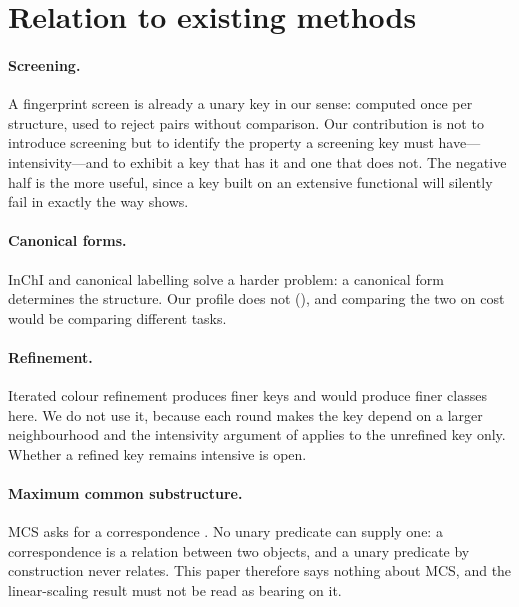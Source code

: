\documentclass[11pt,twocolumn,a4paper]{article}
\theoremstyle{upthm}
\theoremstyle{definition}
\theoremstyle{remark}
\begin{document}
\section{Relation to existing methods}
\label{sec:related}

\paragraph{Screening.} A fingerprint screen \citep{barnard1993,%
willett1998,sayle2012,swamidass2007} is already a unary key in our sense:
computed once per structure, used to reject pairs without comparison. Our
contribution is not to introduce screening but to identify the property a
screening key must have---intensivity---and to exhibit a key that has it
and one that does not. The negative half is the more useful, since a key
built on an extensive functional will silently fail in exactly the way
 shows.

\paragraph{Canonical forms.} InChI \citep{heller2015} and canonical
labelling \citep{morgan1965,mckay2014} solve a harder problem: a
canonical form determines the structure. Our profile does not
(), and comparing the two on cost would be
comparing different tasks.

\paragraph{Refinement.} Iterated colour refinement
\citep{weisfeiler1968,arvind2015} produces finer keys and would produce
finer classes here. We do not use it, because each round makes the key
depend on a larger neighbourhood and the intensivity argument of
 applies to the unrefined key only. Whether a
refined key remains intensive is open.

\paragraph{Maximum common substructure.} MCS asks for a correspondence
\citep{raymond2002,ehrlich2011}. No unary predicate can supply one: a
correspondence is a relation between two objects, and a unary predicate
by construction never relates. This paper therefore says nothing about
MCS, and the linear-scaling result must not be read as bearing on it.
\end{document}
